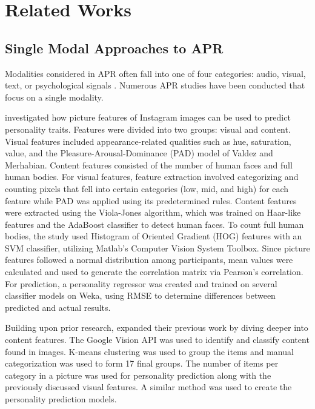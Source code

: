%
%
%                 

\chapter{Related Works}
\label{sec:Related Works}

\section {Single Modal Approaches to APR}
\label{sec: SMApproaches}
Modalities considered in APR often fall into one of four categories: audio, visual, text, or psychological signals \citep{Zhao2022}. Numerous APR studies have been conducted that focus on a single modality. 

\citet{Ferwerda2016} investigated how picture features of Instagram images can be used to predict personality traits. Features were divided into two groups: visual and content. Visual features included appearance-related qualities such as hue, saturation, value, and the Pleasure-Arousal-Dominance (PAD) model of Valdez and Merhabian. Content features consisted of the number of human faces and full human bodies. For visual features, feature extraction involved categorizing and counting pixels that fell into certain categories (low, mid, and high) for each feature while PAD was applied using its predetermined rules. Content features were extracted using the Viola-Jones algorithm, which was trained on Haar-like features and the AdaBoost classifier to detect human faces. To count full human bodies, the study used Histogram of Oriented Gradient (HOG) features with an SVM classifier, utilizing Matlab’s Computer Vision System Toolbox. Since picture features followed a normal distribution among participants, mean values were calculated and used to generate the correlation matrix via Pearson’s correlation. For prediction, a personality regressor was created and trained on several classifier models on Weka, using RMSE to determine differences between predicted and actual results. 

Building upon prior research, \citet{Ferwerda2018} expanded their previous work by diving deeper into content features. The Google Vision API was used to identify and classify content found in images. K-means clustering was used to group the items and manual categorization was used to form 17 final groups. The number of items per category in a picture was used for personality prediction along with the previously discussed visual features. A similar method was used to create the personality prediction models. 


